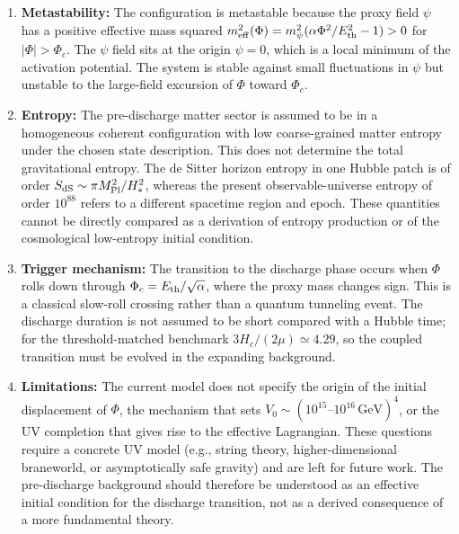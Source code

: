 \documentclass[epj]{svjour}
\begin{document}
\begin{description}
\begin{enumerate}
\item \textbf{Metastability:} The configuration is metastable because
      the proxy field $\psi$ has a positive effective mass squared
      $m_{\rm eff}^2(\Phi) = m_\psi^2(\alpha\Phi^2/E_{\rm th}^2 - 1) > 0$
      for $|\Phi| > \Phi_c$. The $\psi$ field sits at the origin
      $\psi = 0$, which is a local minimum of the activation
      potential. The system is stable against small fluctuations in
      $\psi$ but unstable to the large-field excursion of $\Phi$
      toward $\Phi_c$.

\item \textbf{Entropy:} The pre-discharge matter sector is assumed
      to be in a homogeneous coherent configuration with low
      coarse-grained matter entropy under the chosen state
      description. This does not determine the total gravitational
      entropy. The de Sitter horizon entropy in one Hubble patch is
      of order $S_{\rm dS}\sim\pi M_{\rm Pl}^2/H_*^2$, whereas the
      present observable-universe entropy of order $10^{88}$ refers
      to a different spacetime region and epoch. These quantities
      cannot be directly compared as a derivation of entropy
      production or of the cosmological low-entropy initial
      condition.

\item \textbf{Trigger mechanism:} The transition to the discharge
      phase occurs when $\Phi$ rolls down through
      $\Phi_c = E_{\rm th}/\sqrt{\alpha}$, where the proxy mass
      changes sign. This is a classical slow-roll crossing rather
      than a quantum tunneling event. The discharge duration is not
      assumed to be short compared with a Hubble time; for the
      threshold-matched benchmark $3H_c/(2\mu)\simeq4.29$, so the
      coupled transition must be evolved in the expanding background.

\item \textbf{Limitations:} The current model does not specify the
      origin of the initial displacement of $\Phi$, the mechanism
      that sets $V_0 \sim (10^{15}\text{--}10^{16}\,\mathrm{GeV})^4$,
      or the UV completion that gives rise to the effective
      Lagrangian. These questions require a concrete UV model (e.g.,
      string theory, higher-dimensional braneworld, or asymptotically
      safe gravity) and are left for future work. The pre-discharge
      background should therefore be understood as an effective
      initial condition for the discharge transition, not as a
      derived consequence of a more fundamental theory.
\end{enumerate}


\end{description}
\end{document}
